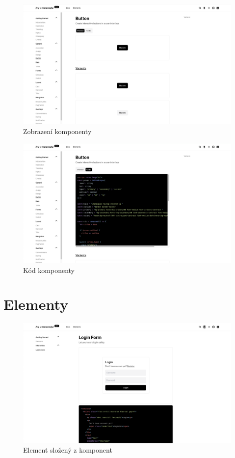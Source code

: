 \begin{figure}[H]
  \includegraphics[width=\textwidth]{images/component-preview}
  \caption{Zobrazení komponenty} \label{picture:documentation:component-preview}
\end{figure}

\begin{figure}[H]
  \includegraphics[width=\textwidth]{images/component-code}
  \caption{Kód komponenty} \label{picture:documentation:component-code}
\end{figure}

\section{Elementy}

\begin{figure}[H]
  \includegraphics[width=\textwidth]{images/element}
  \caption{Element složený z komponent} \label{picture:documentation:element}
\end{figure}

